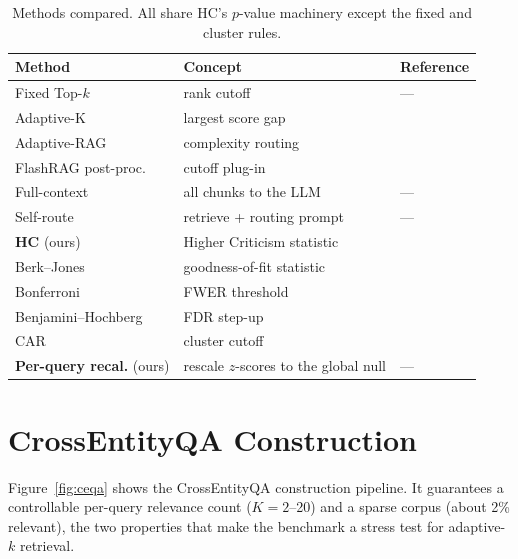 \documentclass[letterpaper]{article} %
\begin{document}
\begin{table}[t]
\centering\small
\begin{tabular}{@{}lll@{}}
\toprule
\textbf{Method} & \textbf{Concept} & \textbf{Reference} \\
\midrule
Fixed Top-$k$        & rank cutoff                & --- \\
Adaptive-K           & largest score gap          & \citep{adaptivek2025} \\
Adaptive-RAG         & complexity routing         & \citep{jeong2024adaptiverag} \\
FlashRAG post-proc.  & cutoff plug-in             & \citep{jin2025flashrag} \\
Full-context         & all chunks to the LLM      & --- \\
Self-route           & retrieve + routing prompt  & --- \\
\textbf{HC} (ours)   & Higher Criticism statistic & \citep{donohojin2004hc} \\
Berk--Jones          & goodness-of-fit statistic  & \citep{berkjones1979} \\
Bonferroni           & FWER threshold             & \citep{bonferroni1961dunn} \\
Benjamini--Hochberg  & FDR step-up                & \citep{benjamini1995fdr} \\
CAR                  & cluster cutoff             & \citep{xu2025car} \\
\textbf{Per-query recal.} (ours) & rescale $z$-scores to the global null & --- \\
\bottomrule
\end{tabular}
\caption{Methods compared. All share HC's $p$-value machinery except the
fixed and cluster rules.}
\label{tab:methods}
\end{table}

\section{CrossEntityQA Construction}
\label{app:ceqa}
Figure~\ref{fig:ceqa} shows the CrossEntityQA construction pipeline. It
guarantees a controllable per-query relevance count ($K{=}2$--20) and a
sparse corpus (about 2\% relevant), the two properties that make the
benchmark a stress test for adaptive-$k$ retrieval.
\end{document}

